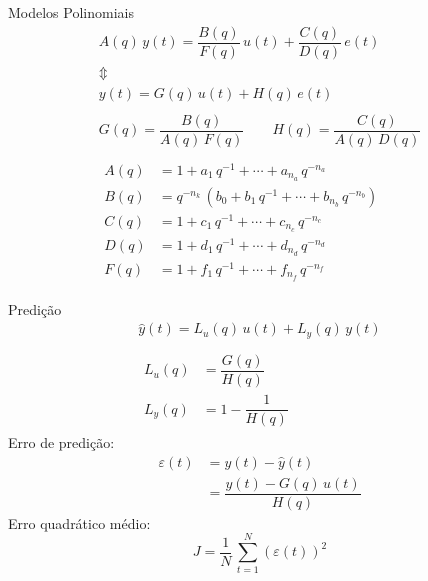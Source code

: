\documentclass{beamer}
\newcommand{\Prod}{\,}
\renewcommand{\Prod}{\,}
\begin{document}
\begin{frame}{Modelos Polinomiais}
  \begin{gather}
    A(q) \Prod y(t) = \dfrac{B(q)}{F(q)} \Prod u(t) + \dfrac{C(q)}{D(q)} \Prod e(t)
    \\\Updownarrow\\
    y(t) = G(q) \Prod u(t) + H(q) \Prod e(t)
    \\\\
    G(q) = \dfrac{B(q)}{A(q) \Prod F(q)}
    \qquad
    H(q) = \dfrac{C(q)}{A(q) \Prod D(q)}
    \\\\
    \begin{aligned}
      A(q) &= 1 + a_1 \Prod q^{-1} + \dotsb + a_{n_a} \Prod q^{-n_a}
      \\
      B(q) &= q^{-n_k} \Prod \left(b_0 + b_1 \Prod q^{-1} + \dotsb + b_{n_b} \Prod q^{-n_b}\right)
      \\
      C(q) &= 1 + c_1 \Prod q^{-1} + \dotsb + c_{n_c} \Prod q^{-n_c}
      \\
      D(q) &= 1 + d_1 \Prod q^{-1} + \dotsb + d_{n_d} \Prod q^{-n_d}
      \\
      F(q) &= 1 + f_1 \Prod q^{-1} + \dotsb + f_{n_f} \Prod q^{-n_f}
    \end{aligned}
  \end{gather}
\end{frame}

\begin{frame}{Predição}
  \begin{gather}
    \hat{y}(t) = L_u(q) \Prod u(t) + L_y(q) \Prod y(t)
    \\\\
    \begin{aligned}
      L_u(q) &= \dfrac{G(q)}{H(q)}
      \\
      L_y(q) &= 1 - \dfrac{1}{H(q)}
    \end{aligned}
  \end{gather}
  Erro de predição:
  \begin{align}
    \varepsilon(t)
    &= y(t) - \hat{y}(t)
    \\
    &= \dfrac{y(t) - G(q) \Prod u(t)}{H(q)}
  \end{align}
  Erro quadrático médio:
  \begin{equation}
    J = \dfrac{1}{N} \Prod \sum_{t=1}^{N}{\left(\varepsilon(t)\right)^2}
  \end{equation}
\end{frame}
\end{document}
